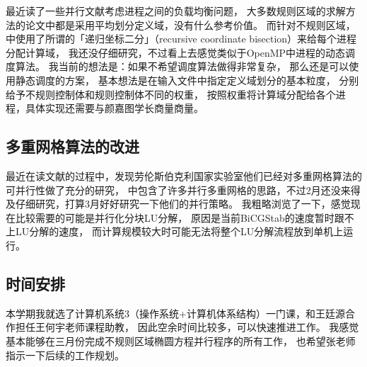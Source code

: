 \documentclass[bibend=bibtex,lang=cn]{elegantpaper}
\theoremstyle{plain}
\begin{document}
最近读了一些并行文献考虑进程之间的负载均衡问题，
大多数规则区域的求解方法的论文中都是采用平均划分定义域，没有什么参考价值。
而针对不规则区域，\cite{adelmann2010fast}中使用了所谓的「递归坐标二分」（recursive coordinate bisection）来给每个进程分配计算域，
我还没仔细研究，不过看上去感觉类似于OpenMP中进程的动态调度算法。
我当前的想法是：如果不希望调度算法做得非常复杂，
那么还是可以使用静态调度的方案，
基本想法是在输入文件中指定定义域划分的基本粒度，
分别给予不规则控制体和规则控制体不同的权重，
按照权重将计算域分配给各个进程，具体实现还需要与颜嘉图学长商量商量。

\subsection{多重网格算法的改进}

最近在读文献的过程中，发现劳伦斯伯克利国家实验室他们已经对多重网格算法的可并行性做了充分的研究，
\cite{chow2006survey}中包含了许多并行多重网格的思路，不过2月还没来得及仔细研究，打算3月好好研究一下他们的并行策略。
我粗略浏览了一下，感觉现在比较需要的可能是并行化分块LU分解，
原因是当前BiCGStab的速度暂时跟不上LU分解的速度，
而计算规模较大时可能无法将整个LU分解流程放到单机上运行。

\subsection{时间安排}

本学期我就选了计算机系统3（操作系统+计算机体系结构）一门课，和王廷源合作担任王何宇老师课程助教，
因此空余时间比较多，可以快速推进工作。
我感觉基本能够在三月份完成不规则区域椭圆方程并行程序的所有工作，
也希望张老师指示一下后续的工作规划。


\nocite{*}
\printbibliography[heading=bibintoc, title=\ebibname]
\end{document}
